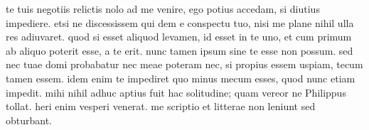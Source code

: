 


te tuis negotiis relictis nolo ad me venire, ego potius accedam, si diutius
            impediere. etsi ne discessissem qui dem e conspectu tuo, nisi me plane
            nihil ulla res adiuvaret. quod si esset aliquod levamen, id esset in te uno,
            et cum primum ab aliquo poterit esse, a te erit. nunc tamen ipsum sine te
            esse non possum. sed nec tuae domi probabatur nec meae poteram nec, si
            propius essem uspiam, tecum tamen essem. idem enim te impediret quo minus
            mecum esses, quod nunc etiam impedit. mihi nihil adhuc aptius fuit hac
            solitudine; quam vereor ne Philippus tollat. heri enim vesperi
            venerat. me scriptio et litterae non leniunt sed obturbant.
